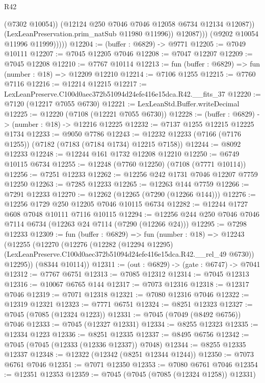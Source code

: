 \begin{lexlean}{R42}
\begin{coremodule}
{                        (@7302 @10054))
                      (@12124 @250 @7046 @7046 @12058 @6734 @12134 @12087))
                    (LexLeanPreservation.prim_natSub @11980 @11996))
                  @12087)))
            (@9202 @10054 @11996 @11999)))))
@12204 := (buffer : @6829) -> @9771
@12205 := @7049 @10111
@12207 := @7045 @12205 @7046
@12208 := @7047 @12207
@12209 := @7045 @12208
@12210 := @7767 @10114
@12213 := fun (buffer : @6829) => fun (number : @18) => @12209 @12210
@12214 := @7106 @1255
@12215 := @7760 @7116
@12216 := @12214 @12215
@12217 := LexLeanPreserve.C100d0aec372b51094d24efe416e15dca.R42.__fits_37
@12220 := @7120 (@12217 @7055 @6730)
@12221 := LexLeanStd.Buffer.writeDecimal
@12225 := @12220 (@7108 (@12221 @7055 @6730))
@12228 := (buffer : @6829) -> (number : @18) -> @12216 @12225
@12232 := @7137 @1255 @12215 @12225 @1734
@12233 := @9050 @7786
@12243 := @12232 @12233 (@7166 (@7176 @1255)) (@7182 (@7183 (@7184 @1734) @12215 @7158))
@12244 := @8092 @12233
@12248 := @12244 @161 @1732 @12208 @12210
@12250 := @6749 @10115 @6734
@12255 := @12248 (@7760 @12250) (@7108 (@7771 @10114))
@12256 := @7251 @12233
@12262 := @12256 @242 @1731 @7046 @12207 @7759 @12250
@12263 := @7285 @12233
@12265 := @12263 @144 @7759
@12266 := @7291 @12233
@12270 := @12262 (@12265 (@7290 (@12266 @144)))
@12276 := @12256 @1729 @250 @12205 @7046 @10115 @6734
@12282 := @12244 @1727 @608 @7048 @10111 @7116 @10115
@12294 := @12256 @244 @250 @7046 @7046 @7114 @6734 (@12263 @24 @7114 (@7290 (@12266 @24)))
@12295 := @7298 @12233
@12309 := fun (buffer : @6829) =>
  fun (number : @18) =>
  @12243
    (@12255
      (@12270
        (@12276
          (@12282
            (@12294 @12295)
            (LexLeanPreserve.C100d0aec372b51094d24efe416e15dca.R42.__rel_49 @6730))
          @12295))
      (@8344 @10114))
@12311 := (out : @6829) -> (gate : @6747) -> @7041
@12312 := @7767 @6751
@12313 := @7085 @12312
@12314 := @7045 @12313
@12316 := @10067 @6765 @144
@12317 := @7073 @12316
@12318 := @12317 @7046
@12319 := @7071 @12318
@12321 := @7080 @12316 @7046
@12322 := @12319 @12321
@12323 := @7771 @6751
@12324 := @8251 @12323
@12327 := @7045 (@7085 (@12324 @1223))
@12331 := @7045 (@7049 (@8492 @6756)) @7046
@12333 := @7045 (@12327 @12331)
@12334 := @8255 @12323
@12335 := @12334 @1223
@12336 := @8251 @12335
@12337 := @8495 @6756
@12342 := @7045 (@7045 (@12333 (@12336 @12337)) @7048)
@12344 := @8255 @12335 @12337
@12348 := @12322 (@12342 (@8251 @12344 @1244))
@12350 := @7073 @6761 @7046
@12351 := @7071 @12350
@12353 := @7080 @6761 @7046
@12354 := @12351 @12353
@12359 := @7045 (@7045 (@7085 (@12324 @1258)) @12331)
}
\end{coremodule}
\end{lexlean}
